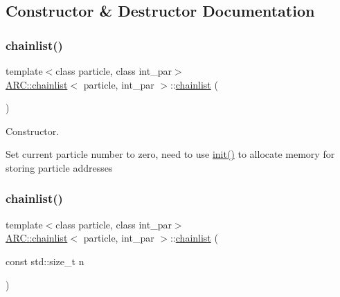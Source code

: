 \subsection{Constructor \& Destructor Documentation}
\hypertarget{classARC_1_1chainlist_a0199d3df0bde74ae090ca274e5e53858}{}\label{classARC_1_1chainlist_a0199d3df0bde74ae090ca274e5e53858} 
\subsubsection{\texorpdfstring{chainlist()}{chainlist()}\hspace{0.1cm}{\footnotesize\ttfamily [1/2]}}
{\footnotesize\ttfamily template$<$class particle, class int\+\_\+par$>$ \\
\hyperlink{classARC_1_1chainlist}{A\+R\+C\+::chainlist}$<$ particle, int\+\_\+par $>$\+::\hyperlink{classARC_1_1chainlist}{chainlist} (\begin{DoxyParamCaption}{ }\end{DoxyParamCaption})\hspace{0.3cm}{\ttfamily [inline]}}



Constructor. 

Set current particle number to zero, need to use \hyperlink{classARC_1_1chainlist_a82f296c7288678df8c279958304e58d8}{init()} to allocate memory for storing particle addresses \hypertarget{classARC_1_1chainlist_aa38cbc27244c85fefb89320d7944956c}{}\label{classARC_1_1chainlist_aa38cbc27244c85fefb89320d7944956c} 
\subsubsection{\texorpdfstring{chainlist()}{chainlist()}\hspace{0.1cm}{\footnotesize\ttfamily [2/2]}}
{\footnotesize\ttfamily template$<$class particle, class int\+\_\+par$>$ \\
\hyperlink{classARC_1_1chainlist}{A\+R\+C\+::chainlist}$<$ particle, int\+\_\+par $>$\+::\hyperlink{classARC_1_1chainlist}{chainlist} (\begin{DoxyParamCaption}\item[{const std\+::size\+\_\+t}]{n }\end{DoxyParamCaption})\hspace{0.3cm}{\ttfamily [inline]}}



